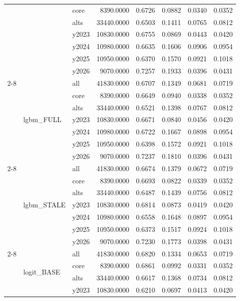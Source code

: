\begin{tabular}{lllrrrrr}
 &  & core & 8390.0000 & 0.6726 & 0.0882 & 0.0340 & 0.0352 \\
 &  & alts & 33440.0000 & 0.6503 & 0.1411 & 0.0765 & 0.0812 \\
 &  & y2023 & 10830.0000 & 0.6755 & 0.0869 & 0.0443 & 0.0420 \\
 &  & y2024 & 10980.0000 & 0.6635 & 0.1606 & 0.0906 & 0.0954 \\
 &  & y2025 & 10950.0000 & 0.6370 & 0.1570 & 0.0921 & 0.1018 \\
 &  & y2026 & 9070.0000 & 0.7257 & 0.1933 & 0.0396 & 0.0431 \\
\cline{2-8}
 & \multirow[t]{7}{*}{lgbm_FULL} & all & 41830.0000 & 0.6707 & 0.1349 & 0.0681 & 0.0719 \\
 &  & core & 8390.0000 & 0.6649 & 0.0940 & 0.0338 & 0.0352 \\
 &  & alts & 33440.0000 & 0.6521 & 0.1398 & 0.0767 & 0.0812 \\
 &  & y2023 & 10830.0000 & 0.6671 & 0.0840 & 0.0456 & 0.0420 \\
 &  & y2024 & 10980.0000 & 0.6722 & 0.1667 & 0.0898 & 0.0954 \\
 &  & y2025 & 10950.0000 & 0.6398 & 0.1572 & 0.0921 & 0.1018 \\
 &  & y2026 & 9070.0000 & 0.7237 & 0.1810 & 0.0396 & 0.0431 \\
\cline{2-8}
 & \multirow[t]{7}{*}{lgbm_STALE} & all & 41830.0000 & 0.6674 & 0.1379 & 0.0672 & 0.0719 \\
 &  & core & 8390.0000 & 0.6693 & 0.0822 & 0.0339 & 0.0352 \\
 &  & alts & 33440.0000 & 0.6487 & 0.1439 & 0.0756 & 0.0812 \\
 &  & y2023 & 10830.0000 & 0.6814 & 0.0873 & 0.0419 & 0.0420 \\
 &  & y2024 & 10980.0000 & 0.6558 & 0.1648 & 0.0897 & 0.0954 \\
 &  & y2025 & 10950.0000 & 0.6373 & 0.1517 & 0.0924 & 0.1018 \\
 &  & y2026 & 9070.0000 & 0.7230 & 0.1773 & 0.0398 & 0.0431 \\
\cline{2-8}
 & \multirow[t]{7}{*}{logit_BASE} & all & 41830.0000 & 0.6820 & 0.1334 & 0.0653 & 0.0719 \\
 &  & core & 8390.0000 & 0.6861 & 0.0992 & 0.0331 & 0.0352 \\
 &  & alts & 33440.0000 & 0.6617 & 0.1368 & 0.0734 & 0.0812 \\
 &  & y2023 & 10830.0000 & 0.6210 & 0.0697 & 0.0413 & 0.0420 \\

\end{tabular}
